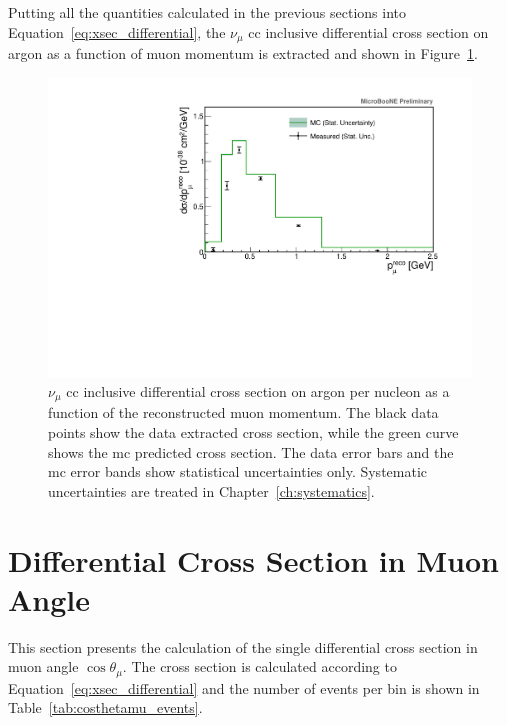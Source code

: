 Putting all the quantities calculated in the previous sections into Equation~\eqref{eq:xsec_differential}, the $\nu_\mu$ \acrshort{cc} inclusive differential cross section on argon as a function of muon momentum is extracted and shown in Figure~\ref{fig:trkmom_xsec}. 
\begin{figure}[t]
\centering
\includegraphics[width=.80\textwidth]{images/XSecPmu/trkmom_xsec}
\caption[$d\sigma/dp_\mu$ Single Differential Cross Section (Stat. Unc. Only)]{$\nu_\mu$ \acrshort{cc} inclusive differential cross section on argon per nucleon as a function of the reconstructed muon momentum. The black data points show the data extracted cross section, while the green curve shows the \acrshort{mc} predicted cross section. The data error bars and the \acrshort{mc} error bands show statistical uncertainties only. Systematic uncertainties are treated in Chapter~\ref{ch:systematics}.}
\label{fig:trkmom_xsec}
\end{figure}



\clearpage
\section[Cross Section: Muon Angle]{Differential Cross Section in Muon Angle}
\label{sec:muangle_xsec}

This section presents the calculation of the single differential cross section in muon angle $\cos\theta_\mu$. The cross section is calculated according to Equation~\eqref{eq:xsec_differential} and the number of events per bin is shown in Table~\ref{tab:costhetamu_events}.





